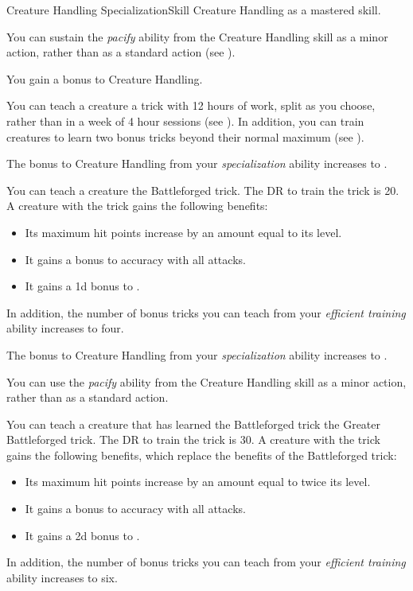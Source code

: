     \begin{feat}{Creature Handling Specialization}{Skill}
        \featpre Creature Handling as a mastered skill.

         You can sustain the \textit{pacify} ability from the Creature Handling skill as a minor action, rather than as a standard action (see ).

         You gain a  bonus to Creature Handling.

         You can teach a creature a trick with 12 hours of work, split as you choose, rather than in a week of 4 hour sessions (see ).
        In addition, you can train creatures to learn two bonus tricks beyond their normal maximum (see ).

         The bonus to Creature Handling from your \textit{specialization} ability increases to .

         You can teach a creature the Battleforged trick.
        The DR to train the trick is 20.
        A creature with the trick gains the following benefits:
        \begin{itemize}
            \item Its maximum hit points increase by an amount equal to its level.
            \item It gains a  bonus to accuracy with all attacks.
            \item It gains a \plus1d bonus to .
        \end{itemize}
        In addition, the number of bonus tricks you can teach from your \textit{efficient training} ability increases to four.

         The bonus to Creature Handling from your \textit{specialization} ability increases to .

         You can use the \textit{pacify} ability from the Creature Handling skill as a minor action, rather than as a standard action.

         You can teach a creature that has learned the Battleforged trick the Greater Battleforged trick.
        The DR to train the trick is 30.
        A creature with the trick gains the following benefits, which replace the benefits of the Battleforged trick:
        \begin{itemize}
            \item Its maximum hit points increase by an amount equal to twice its level.
            \item It gains a  bonus to accuracy with all attacks.
            \item It gains a \plus2d bonus to .
        \end{itemize}
        In addition, the number of bonus tricks you can teach from your \textit{efficient training} ability increases to six.
    \end{feat}

